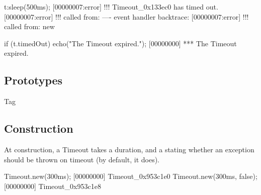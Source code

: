 \begin{urbiscript}
t:sleep(500ms);
[00000007:error] !!! Timeout_0x133ec0 has timed out.
[00000007:error] !!!    called from: ---- event handler backtrace:
[00000007:error] !!!    called from: new

if (t.timedOut)
  echo("The Timeout expired.");
[00000000] *** The Timeout expired.
\end{urbiscript}

\subsection{Prototypes}
\begin{refObjects}
\item[Tag]
\end{refObjects}

\subsection{Construction}
At construction, a Timeout takes a duration, and a 
stating whether an exception should be thrown on timeout (by default,
it does).

\begin{urbiscript}
Timeout.new(300ms);
[00000000] Timeout_0x953c1e0
Timeout.new(300ms, false);
[00000000] Timeout_0x953c1e8
\end{urbiscript}


